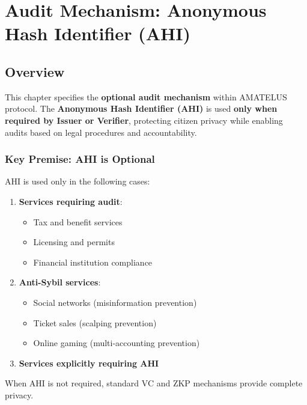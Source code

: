 
\chapter{Audit Mechanism: Anonymous Hash Identifier (AHI)}

\section{Overview}

This chapter specifies the \textbf{optional audit mechanism} within AMATELUS protocol.
The \textbf{Anonymous Hash Identifier (AHI)} is used \textbf{only when required by Issuer or Verifier},
protecting citizen privacy while enabling audits based on legal procedures and accountability.

\subsection{Key Premise: AHI is Optional}

AHI is used only in the following cases:

\begin{enumerate}
  \item \textbf{Services requiring audit}:
    \begin{itemize}
      \item Tax and benefit services
      \item Licensing and permits
      \item Financial institution compliance
    \end{itemize}

  \item \textbf{Anti-Sybil services}:
    \begin{itemize}
      \item Social networks (misinformation prevention)
      \item Ticket sales (scalping prevention)
      \item Online gaming (multi-accounting prevention)
    \end{itemize}

  \item \textbf{Services explicitly requiring AHI}
\end{enumerate}

When AHI is not required, standard VC and ZKP mechanisms provide complete privacy.

